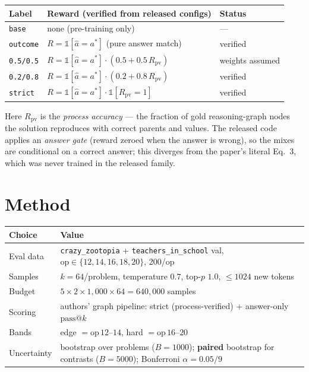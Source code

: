 \documentclass[11pt]{article}
\makeatletter
\newcommand{\passk}[1]{\ensuremath{\mathrm{pass}@#1}}
\newcommand{\Rpv}{\ensuremath{R_{\mathrm{pv}}}}
\newcommand{\ind}[1]{\ensuremath{\mathbb{1}\!\left[#1\right]}}
\makeatother
\begin{document}
\begin{table}[h]\centering\small
\begin{tabular}{lll}
\toprule
Label & Reward (verified from released configs) & Status \\
\midrule
\texttt{base} & none (pre-training only) & --- \\
\texttt{outcome} & $R = \ind{\hat a = a^{*}}$ (pure answer match) & verified \\
\texttt{0.5/0.5} & $R = \ind{\hat a = a^{*}}\cdot(0.5 + 0.5\,\Rpv)$ & weights assumed \\
\texttt{0.2/0.8} & $R = \ind{\hat a = a^{*}}\cdot(0.2 + 0.8\,\Rpv)$ & verified \\
\texttt{strict} & $R = \ind{\hat a = a^{*}}\cdot\ind{\Rpv = 1}$ & verified \\
\bottomrule
\end{tabular}
\end{table}

\noindent Here $\Rpv$ is the \emph{process accuracy} --- the fraction of gold
reasoning-graph nodes the solution reproduces with correct parents and values. The
released code applies an \emph{answer gate} (reward zeroed when the answer is wrong), so
the mixes are conditional on a correct answer; this diverges from the paper's literal
Eq.~3, which was never trained in the released family.

\section{Method}

\begin{table}[h]\centering\small
\begin{tabular}{ll}
\toprule
Choice & Value \\
\midrule
Eval data & \texttt{crazy\_zootopia} + \texttt{teachers\_in\_school} val, $\mathrm{op}\in\{12,14,16,18,20\}$, 200/op \\
Samples & $k=64$/problem, temperature $0.7$, top-$p$ $1.0$, $\le 1024$ new tokens \\
Budget & $5 \times 2 \times 1{,}000 \times 64 = 640{,}000$ samples \\
Scoring & authors' graph pipeline: strict (process-verified) + answer-only \passk{k} \\
Bands & edge $=\mathrm{op}\,12$--$14$, hard $=\mathrm{op}\,16$--$20$ \\
Uncertainty & bootstrap over problems ($B{=}1000$); \textbf{paired} bootstrap for contrasts ($B{=}5000$); Bonferroni $\alpha{=}0.05/9$ \\
\bottomrule
\end{tabular}
\end{table}
\end{document}
